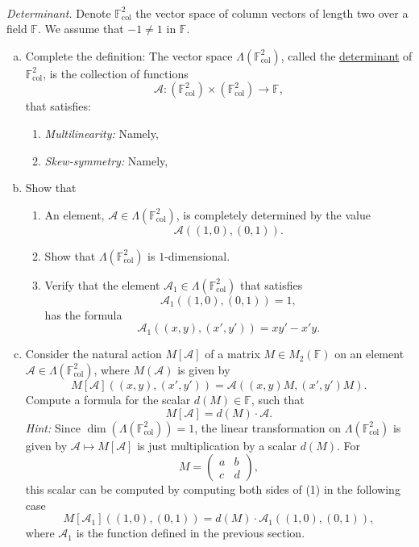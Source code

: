 \documentclass{article}
\begin{document}
\begin{problem} \\ 
   \textit{Determinant.} Denote $\mathbb{F}^2_{\text{col}}$ the vector space of column vectors of length two over a field $\mathbb{F}$. We assume that $-1 \neq 1$ in $\mathbb{F}$.
   \begin{enumerate}[a)]
      \item Complete the definition: The vector space $\Lambda(\mathbb{F}^2_{\text{col}})$, called the \underline{determinant} of $\mathbb{F}^2_{\text{col}}$, is the collection of functions 
      \[
         \mathscr{A}: (\mathbb{F}^2_{\text{col}}) \times (\mathbb{F}^2_{\text{col}}) \to \mathbb{F},
      \]
      that satisfies:
      \begin{enumerate}[1.]
         \item \textit{Multilinearity:} Namely,
         \item \textit{Skew-symmetry:} Namely,
      \end{enumerate}
      \item Show that 
      \begin{enumerate}[1.]
         \item An element, $\mathscr{A} \in \Lambda(\mathbb{F}^2_{\text{col}})$, is completely determined by the value 
         \[
            \mathscr{A}((1,0),(0,1)).
         \]
         \item Show that $\Lambda(\mathbb{F}^2_{\text{col}})$ is $1$-dimensional.
         \item Verify that the element $\mathscr{A}_1\in \Lambda(\mathbb{F}^2_{\text{col}})$ that satisfies
         \[
            \mathscr{A}_1((1,0),(0,1)) = 1,
         \]
         has the formula 
         \[
            \mathscr{A}_1((x,y),(x',y')) = xy' - x'y.
         \]
      \end{enumerate}
      \item Consider the natural action $M[\mathscr{A}]$ of a matrix $M \in M_2(\mathbb{F})$ on an element $\mathscr{A} \in \Lambda(\mathbb{F}^2_{\text{col}})$, where $M(\mathscr{A})$ is given by
      \[
         M[\mathscr{A}]((x,y),(x',y')) = \mathscr{A}((x,y)M,(x',y')M).
      \]
      Compute a formula for the scalar $d(M) \in \mathbb{F}$, such that 
      \[
         M[\mathscr{A}] = d(M) \cdot \mathscr{A}.
      \]
      \textit{Hint:} Since $\dim(\Lambda(\mathbb{F}^2_{\text{col}})) = 1$, the linear transformation on $\Lambda(\mathbb{F}^2_{\text{col}})$ is given by $\mathscr{A} \mapsto M[\mathscr{A}]$ is just multiplication by a scalar $d(M)$. For 
      \[
         M = \begin{pmatrix}
            a & b \\
            c & d
         \end{pmatrix},
      \]
      this scalar can be computed by computing both sides of (1) in the following case
      \[
         M[\mathscr{A}_1]((1,0),(0,1)) = d(M) \cdot \mathscr{A}_1((1,0),(0,1)),
      \]
      where $\mathscr{A}_1$ is the function defined in the previous section.
      \end{enumerate}
\end{problem}
\end{document}

